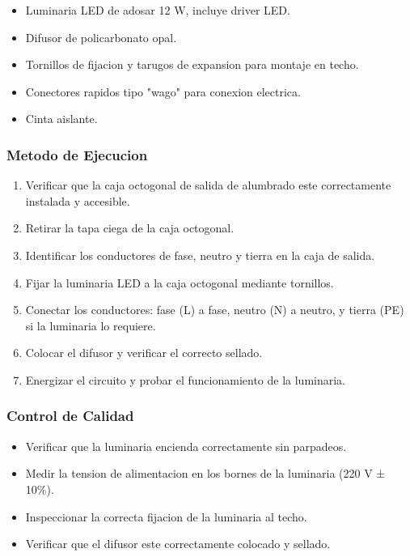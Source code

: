 \begin{itemize}
  \item Luminaria LED de adosar 12 W, incluye driver LED.
  \item Difusor de policarbonato opal.
  \item Tornillos de fijacion y tarugos de expansion para montaje en techo.
  \item Conectores rapidos tipo "wago" para conexion electrica.
  \item Cinta aislante.
\end{itemize}

\subsubsection{Metodo de Ejecucion}

\begin{enumerate}
  \item Verificar que la caja octogonal de salida de alumbrado este correctamente instalada y accesible.
  \item Retirar la tapa ciega de la caja octogonal.
  \item Identificar los conductores de fase, neutro y tierra en la caja de salida.
  \item Fijar la luminaria LED a la caja octogonal mediante tornillos.
  \item Conectar los conductores: fase (L) a fase, neutro (N) a neutro, y tierra (PE) si la luminaria lo requiere.
  \item Colocar el difusor y verificar el correcto sellado.
  \item Energizar el circuito y probar el funcionamiento de la luminaria.
\end{enumerate}

\subsubsection{Control de Calidad}

\begin{itemize}
  \item Verificar que la luminaria encienda correctamente sin parpadeos.
  \item Medir la tension de alimentacion en los bornes de la luminaria (220 V ± 10\%).
  \item Inspeccionar la correcta fijacion de la luminaria al techo.
  \item Verificar que el difusor este correctamente colocado y sellado.
\end{itemize}


